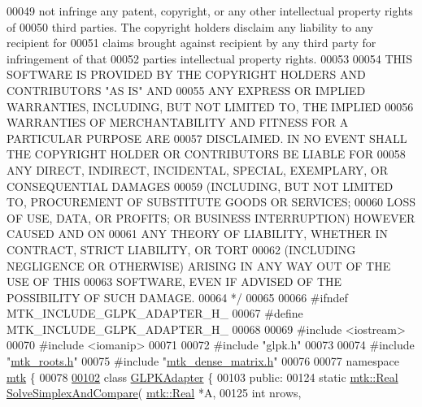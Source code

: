 \begin{DoxyCode}
00049 \textcolor{comment}{not infringe any patent, copyright, or any other intellectual property rights of}
00050 \textcolor{comment}{third parties. The copyright holders disclaim any liability to any recipient for}
00051 \textcolor{comment}{claims brought against recipient by any third party for infringement of that}
00052 \textcolor{comment}{parties intellectual property rights.}
00053 \textcolor{comment}{}
00054 \textcolor{comment}{THIS SOFTWARE IS PROVIDED BY THE COPYRIGHT HOLDERS AND CONTRIBUTORS "AS IS" AND}
00055 \textcolor{comment}{ANY EXPRESS OR IMPLIED WARRANTIES, INCLUDING, BUT NOT LIMITED TO, THE IMPLIED}
00056 \textcolor{comment}{WARRANTIES OF MERCHANTABILITY AND FITNESS FOR A PARTICULAR PURPOSE ARE}
00057 \textcolor{comment}{DISCLAIMED. IN NO EVENT SHALL THE COPYRIGHT HOLDER OR CONTRIBUTORS BE LIABLE FOR}
00058 \textcolor{comment}{ANY DIRECT, INDIRECT, INCIDENTAL, SPECIAL, EXEMPLARY, OR CONSEQUENTIAL DAMAGES}
00059 \textcolor{comment}{(INCLUDING, BUT NOT LIMITED TO, PROCUREMENT OF SUBSTITUTE GOODS OR SERVICES;}
00060 \textcolor{comment}{LOSS OF USE, DATA, OR PROFITS; OR BUSINESS INTERRUPTION) HOWEVER CAUSED AND ON}
00061 \textcolor{comment}{ANY THEORY OF LIABILITY, WHETHER IN CONTRACT, STRICT LIABILITY, OR TORT}
00062 \textcolor{comment}{(INCLUDING NEGLIGENCE OR OTHERWISE) ARISING IN ANY WAY OUT OF THE USE OF THIS}
00063 \textcolor{comment}{SOFTWARE, EVEN IF ADVISED OF THE POSSIBILITY OF SUCH DAMAGE.}
00064 \textcolor{comment}{*/}
00065 
00066 \textcolor{preprocessor}{#ifndef MTK\_INCLUDE\_GLPK\_ADAPTER\_H\_}
00067 \textcolor{preprocessor}{#define MTK\_INCLUDE\_GLPK\_ADAPTER\_H\_}
00068 
00069 \textcolor{preprocessor}{#include <iostream>}
00070 \textcolor{preprocessor}{#include <iomanip>}
00071 
00072 \textcolor{preprocessor}{#include "glpk.h"}
00073 
00074 \textcolor{preprocessor}{#include "\hyperlink{mtk__roots_8h}{mtk\_roots.h}"}
00075 \textcolor{preprocessor}{#include "\hyperlink{mtk__dense__matrix_8h}{mtk\_dense\_matrix.h}"}
00076 
00077 \textcolor{keyword}{namespace }\hyperlink{namespacemtk}{mtk} \{
00078 
\hypertarget{mtk__glpk__adapter_8h_source_l00102}{}\hyperlink{classmtk_1_1GLPKAdapter}{00102} \textcolor{keyword}{class }\hyperlink{classmtk_1_1GLPKAdapter}{GLPKAdapter} \{
00103  \textcolor{keyword}{public}:
00124   \textcolor{keyword}{static} \hyperlink{group__c01-roots_gac080bbbf5cbb5502c9f00405f894857d}{mtk::Real} \hyperlink{classmtk_1_1GLPKAdapter_a834480aca83e3c0d09fdab7fdb7e8a3f}{SolveSimplexAndCompare}(
      \hyperlink{group__c01-roots_gac080bbbf5cbb5502c9f00405f894857d}{mtk::Real} *A,
00125                                           \textcolor{keywordtype}{int} nrows,

\end{DoxyCode}
